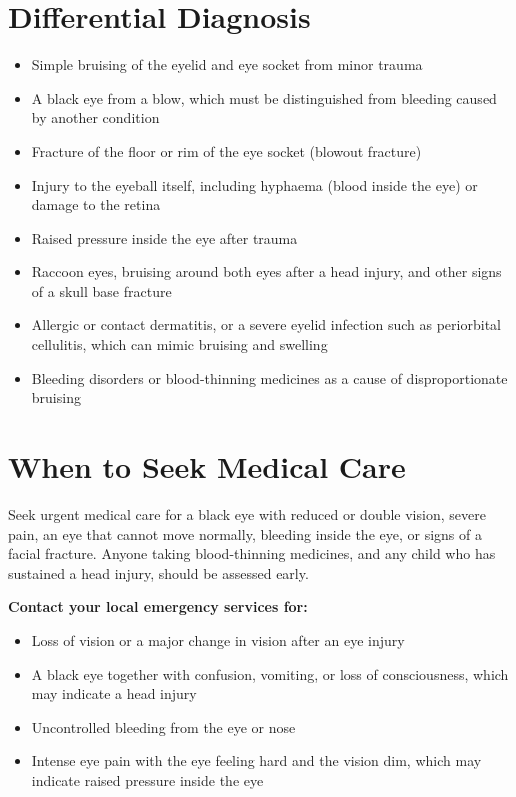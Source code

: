 \section*{Differential Diagnosis}
\begin{itemize}
    \item Simple bruising of the eyelid and eye socket from minor trauma
    \item A black eye from a blow, which must be distinguished from bleeding caused by another condition
    \item Fracture of the floor or rim of the eye socket (blowout fracture)
    \item Injury to the eyeball itself, including hyphaema (blood inside the eye) or damage to the retina
    \item Raised pressure inside the eye after trauma
    \item Raccoon eyes, bruising around both eyes after a head injury, and other signs of a skull base fracture
    \item Allergic or contact dermatitis, or a severe eyelid infection such as periorbital cellulitis, which can mimic bruising and swelling
    \item Bleeding disorders or blood-thinning medicines as a cause of disproportionate bruising
\end{itemize}

\section*{When to Seek Medical Care}
Seek urgent medical care for a black eye with reduced or double vision, severe pain, an eye that cannot move normally, bleeding inside the eye, or signs of a facial fracture. Anyone taking blood-thinning medicines, and any child who has sustained a head injury, should be assessed early.

\textbf{Contact your local emergency services for:}
\begin{itemize}
    \item Loss of vision or a major change in vision after an eye injury
    \item A black eye together with confusion, vomiting, or loss of consciousness, which may indicate a head injury
    \item Uncontrolled bleeding from the eye or nose
    \item Intense eye pain with the eye feeling hard and the vision dim, which may indicate raised pressure inside the eye
\end{itemize}

